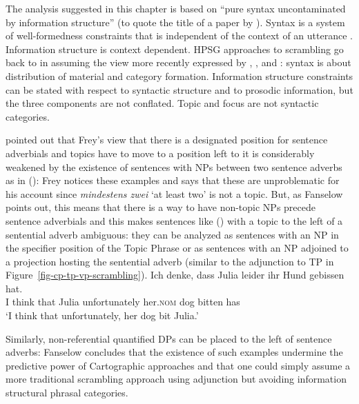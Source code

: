 The analysis suggested in this chapter is based on ``pure syntax uncontaminated by information
structure'' (to quote the title of a paper by \citealt{Fanselow2006a}). Syntax is a system of
well-formedness constraints that is independent of the context of an utterance \citep{Fanselow2006a}\addpages. Information
structure is context dependent. HPSG approaches to scrambling go back to \citet{Gunji86a} in assuming
the view more recently expressed by \citet{Fanselow2003b,Fanselow2006a}, \citet{NK2008a-u}, \citet[]{Struckmeier2017a} and \citet{Haider2021a}: syntax is
about distribution of material and category formation. Information structure constraints can be
stated with respect to syntactic structure \citep{EV94a,EV96a,DeKuthy2021a} and to prosodic information, but the three components are
not conflated. Topic and focus are not syntactic categories.  



\citet{Fanselow2006a} pointed out that Frey's view that there is a designated
position for sentence adverbials and topics have to move to a position left to it is considerably
weakened by the existence of sentences with NPs between two sentence adverbs as in ():
\ea
{}
\z
Frey notices these examples and says that these are unproblematic for his account since
\emph{mindestens zwei} `at least two' is not a topic. But, as Fanselow points out, this means that there is a way
to have non-topic NPs precede sentence adverbials and this makes sentences like () with a topic to the left of a
sentential adverb ambiguous: they can be analyzed as sentences with an NP in the specifier position
of the Topic Phrase or as sentences with an NP adjoined to a projection hosting the sentential
adverb (similar to the adjunction to TP in Figure~\ref{fig-cp-tp-vp-scrambling}).
\ea
\gll Ich denke, dass Julia leider        ihr Hund gebissen hat.\\
     I   think  that Julia unfortunately her.\textsc{nom} dog bitten has\\\german
\glt `I think that unfortunately, her dog bit Julia.'
\z

\noindent
Similarly, non-referential quantified DPs can be placed to the left of sentence adverbs:
\ea
{}
\z
Fanselow concludes that the existence of such examples undermine the predictive power of
Cartographic approaches and that one could simply assume a more traditional scrambling approach
using adjunction but avoiding information structural phrasal categories.

